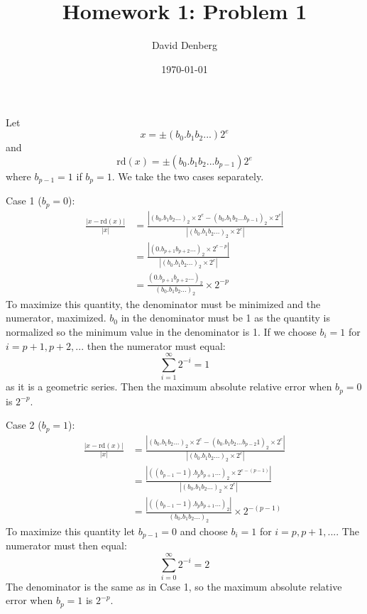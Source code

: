 \documentclass[12pt]{article}
\title{Homework 1: Problem 1}
\author{David Denberg}
\date{\today}
\begin{document}
\maketitle

\noindent
Let 
\[
x = \pm (b_0.b_1 b_2...) 2^e
\]
and 
\[
\mathrm{rd}(x) = \pm (b_0.b_1 b_2...b_{p-1}) 2^e
\]
where $b_{p-1} = 1$ if $b_p = 1$. We take the two cases separately. 

\noindent
Case 1 ($b_p = 0$):
\begin{align*}
\frac{|x - \mathrm{rd}(x)|}{|x|} &= \frac{|(b_0.b_1 b_2 ...)_2 \times 2^e - (b_0.b_1 b_2...b_{p-1})_2 \times 2^e|}{|(b_0.b_1 b_2 ...)_2 \times 2^e|} \\
&= \frac{|(0.b_{p+1} b_{p+2} ...)_2 \times 2^{e-p}|}{|(b_0.b_1 b_2 ...)_2 \times 2^e|} \\
&= \frac{(0.b_{p+1} b_{p+2} ...)_2}{(b_0.b_1 b_2 ...)_2} \times 2^{-p}
\end{align*}
To maximize this quantity, the denominator must be minimized and the numerator, maximized. $b_0$ in the denominator must be 1 as the quantity is normalized so the minimum value in the denominator is 1. If we choose $b_i = 1$ for $i = p+1,p+2,...$ then the numerator must equal:
\[
\sum_{i=1}^{\infty} 2^{-i} = 1
\]
as it is a geometric series. Then the maximum absolute relative error when $b_p = 0$ is $2^{-p}$.

\noindent
Case 2 ($b_p = 1$):
\begin{align*}
\frac{|x - \mathrm{rd}(x)|}{|x|} &= \frac{|(b_0.b_1 b_2 ...)_2 \times 2^e - (b_0.b_1 b_2...b_{p-2} 1)_2 \times 2^e|}{|(b_0.b_1 b_2 ...)_2 \times 2^e|} \\
&= \frac{|((b_{p-1} - 1).b_{p} b_{p+1} ...)_2 \times 2^{e-(p-1)}|}{|(b_0.b_1 b_2 ...)_2 \times 2^e|} \\
&= \frac{|((b_{p-1} - 1).b_{p} b_{p+1} ...)_2|}{(b_0.b_1 b_2 ...)_2} \times 2^{-(p-1)}
\end{align*}
To maximize this quantity let $b_{p-1} = 0$ and choose $b_i = 1$ for $i = p,p+1,...$. The numerator must then equal:
\[
\sum_{i=0}^{\infty} 2^{-i} = 2
\]
The denominator is the same as in Case 1, so the maximum absolute relative error when $b_p = 1$ is $2^{-p}$.
\end{document}
